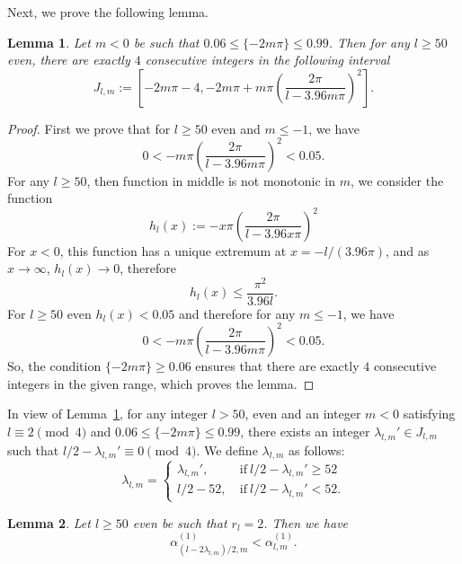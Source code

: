 \documentclass[12pt,reqno]{amsart}
\newtheorem{lem}{Lemma}
\newcommand{\lemref}[1]{Lemma~\ref{#1}}
\begin{document}
Next, we prove the following lemma.
\begin{lem}\label{cons}
Let $m<0$ be such that  $0.06\le \{-2m\pi\}\le 0.99$. Then for any $l\ge 50$ even, there are exactly $4$ 
consecutive integers in the following interval
$$J_{l,m}:=\left[-2m\pi-4,-2m\pi+m\pi\left(\frac{2\pi}{l-3.96m\pi}\right)^2\right].$$
\end{lem}
\begin{proof}
First we prove that for $l\ge 50$ even and $m\le-1$, we have
$$
0<-m\pi\left(\frac{2\pi}{l-3.96m\pi}\right)^2<0.05.
$$
For any $l\ge 50$, then function in middle is not monotonic in $m$, 
we consider the function
$$
h_{l}(x):=-x\pi\left(\frac{2\pi}{l-3.96x\pi}\right)^2
$$
For $x<0$, this function has a unique extremum at $x=-l/(3.96\pi)$, and as 
$x\to \infty$, $h_l(x)\to 0$, therefore
$$
h_{l}(x)\le\frac{\pi^2}{3.96l}.
$$
For $l\ge 50$ even $h_l(x)< 0.05$ and therefore for any $m\le-1$, we have
\begin{equation}\label{0.09}
0<-m\pi\left(\frac{2\pi}{l-3.96m\pi}\right)^2<0.05.
\end{equation}
So, the condition $\{-2m\pi\}\ge 0.06$ ensures that there are exactly $4$ consecutive integers 
in the given range, which proves the lemma.
\end{proof}

In view of \lemref{cons}, for any integer $l>50$, even and an integer $m<0$ satisfying $l\equiv2\pmod 4$ and
$0.06\le\{-2m\pi\}\le0.99$, there exists an integer $\lambda_{l,m}'\in J_{l,m}$ such that 
$l/2-\lambda_{l,m}'\equiv0\pmod4$. We define $\lambda_{l,m}$ as follows:
$$
\lambda_{l,m}=
\begin{cases}
\lambda_{l,m}', & \ \text{if}\   l/2-\lambda_{l,m}'\ge52\\
l/2-52, & \ \text{if}\ l/2-\lambda_{l,m}'<52.
\end{cases}
$$

\begin{lem}\label{k<lam}
Let $l\ge 50$ even be such that $r_l=2$. Then we have 
$$
\alpha_{(l-2\lambda_{l,m})/2,m}^{(1)}<\alpha_{l,m}^{(1)}.
$$
\end{lem}
\end{document}
